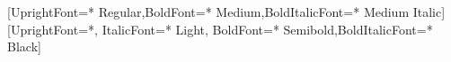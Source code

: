 \usepackage[utf8]{inputenc}
\usepackage[english]{babel}
\usepackage{amsfonts}
\usepackage{amssymb}
\usepackage{amsmath}

\usepackage{xspace}
\usepackage{iftex}

\usepackage[natbib,
style=authortitle,
maxbibnames=6,
maxcitenames=2,
citestyle=authoryear-comp,
backend=biber]{biblatex}



\usepackage{hyperref}
\usepackage[usenames]{xcolor}
\usepackage{grffile}
\usepackage{graphicx}

\ifXeTeX
    \usepackage[no-math]{fontspec}
    \setsansfont{Avenir Next}[UprightFont={* Regular},BoldFont={* Medium},BoldItalicFont={* Medium Italic}]
    \setmonofont{Source Code Pro}[UprightFont={*}, ItalicFont={* Light}, BoldFont={* Semibold},BoldItalicFont={* Black}]

\else
    \usepackage{fourier}
\fi



